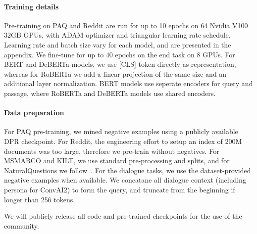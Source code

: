 \documentclass[11pt]{article}
\begin{document}
\paragraph{Training details}
Pre-training on PAQ and Reddit are run for up to 10 epochs on 64 Nvidia V100 32GB GPUs, with ADAM optimizer and triangular learning rate schedule.  Learning rate and batch size vary for each model, and are presented in the appendix. We fine-tune for up to 40 epochs on the end task on 8 GPUs.  For BERT and DeBERTa models, we use [CLS] token directly as representation, whereas for RoBERTa we add a linear projection of the same size and an additional layer normalization. BERT models use seperate encoders for query and passage, where RoBERTa and DeBERTa models use shared encoders.  

\paragraph{Data preparation}
For PAQ pre-training, we mined negative examples using a publicly available DPR checkpoint.  For Reddit, the engineering effort to setup an index of 200M documents was too large, therefore we pre-train without negatives.  For MSMARCO and KILT, we use standard pre-processing and splits, and for NaturalQuestions we follow~\citep{dpr}.  For the dialogue tasks, we use the dataset-provided negative examples when available.  We concatane all dialogue context (including persona for ConvAI2) to form the query, and truncate from the beginning if longer than 256 tokens.  

We will publicly release all code and pre-trained checkpoints for the use of the community.
\end{document}
